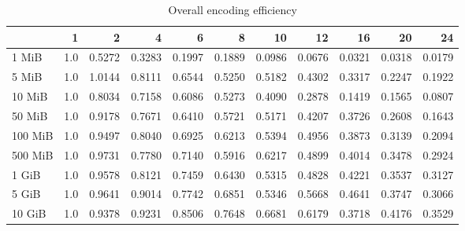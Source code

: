 \begin{table}[!h]
	\caption{Overall encoding efficiency}
\begin{tabular}{lrrrrrrrrrr}
	\toprule
	\diagbox{File sizes }{Threads} &   1  &      2  &      4  &      6  &      8  &      10 &      12 &      16 &      20 &      24 \\
	\midrule
	1 MiB   &  1.0 &  0.5272 &  0.3283 &  0.1997 &  0.1889 &  0.0986 &  0.0676 &  0.0321 &  0.0318 &  0.0179 \\
	5 MiB   &  1.0 &  1.0144 &  0.8111 &  0.6544 &  0.5250 &  0.5182 &  0.4302 &  0.3317 &  0.2247 &  0.1922 \\
	10 MiB  &  1.0 &  0.8034 &  0.7158 &  0.6086 &  0.5273 &  0.4090 &  0.2878 &  0.1419 &  0.1565 &  0.0807 \\
	50 MiB  &  1.0 &  0.9178 &  0.7671 &  0.6410 &  0.5721 &  0.5171 &  0.4207 &  0.3726 &  0.2608 &  0.1643 \\
	100 MiB &  1.0 &  0.9497 &  0.8040 &  0.6925 &  0.6213 &  0.5394 &  0.4956 &  0.3873 &  0.3139 &  0.2094 \\
	500 MiB &  1.0 &  0.9731 &  0.7780 &  0.7140 &  0.5916 &  0.6217 &  0.4899 &  0.4014 &  0.3478 &  0.2924 \\
	1 GiB   &  1.0 &  0.9578 &  0.8121 &  0.7459 &  0.6430 &  0.5315 &  0.4828 &  0.4221 &  0.3537 &  0.3127 \\
	5 GiB   &  1.0 &  0.9641 &  0.9014 &  0.7742 &  0.6851 &  0.5346 &  0.5668 &  0.4641 &  0.3747 &  0.3066 \\
	10 GiB  &  1.0 &  0.9378 &  0.9231 &  0.8506 &  0.7648 &  0.6681 &  0.6179 &  0.3718 &  0.4176 &  0.3529 \\
	\bottomrule
\end{tabular}
\end{table}
